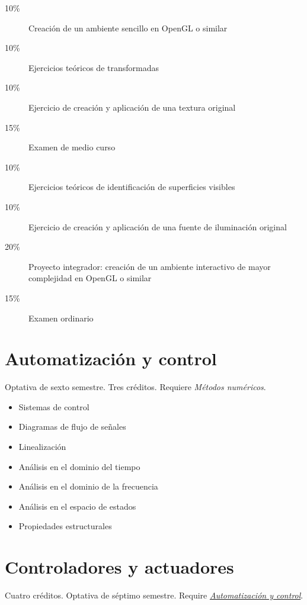 \documentclass{article}
\begin{document}
\begin{multicols}{4}
\begin{description}
\item[10\%]{Creaci\'{o}n de un ambiente sencillo en OpenGL o similar}
\item[10\%]{Ejercicios te\'{o}ricos de transformadas}
\item[10\%]{Ejercicio de creaci\'{o}n y aplicaci\'{o}n de una textura original}
\item[15\%]{Examen de medio curso}  
\item[10\%]{Ejercicios te\'{o}ricos de identificaci\'{o}n de superficies visibles}
\item[10\%]{Ejercicio de creaci\'{o}n y aplicaci\'{o}n de una fuente de
  iluminaci\'{o}n original}
\item[20\%]{Proyecto integrador: creaci\'{o}n de un ambiente interactivo
  de mayor complejidad en OpenGL o similar}
\item[15\%]{Examen ordinario}
\end{description}  

\newpage

\hypertarget{ayc}{\section*{Automatizaci\'{o}n y control}} 

Optativa de sexto semestre. Tres cr\'{e}ditos. Requiere {\em
  M\'{e}todos num\'{e}ricos}.

\begin{itemize}
\item{Sistemas de control}
\item{Diagramas de flujo de se\~{n}ales}
\item{Linealizaci\'{o}n}
\item{An\'{a}lisis en el dominio del tiempo}
\item{An\'{a}lisis en el dominio de la frecuencia}
\item{An\'{a}lisis en el espacio de estados}
\item{Propiedades estructurales}
\end{itemize}

\vfill\null \columnbreak


\hypertarget{cya}{\section*{Controladores y actuadores}} 

Cuatro cr\'{e}ditos. Optativa de s\'{e}ptimo semestre. Require
\hyperlink{ayc}{\em Automatizaci\'{o}n y control}.


\end{multicols}
\end{document}

